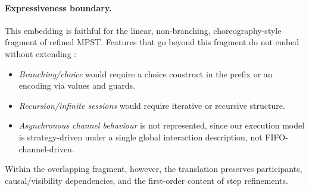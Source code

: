 \paragraph{Expressiveness boundary.}
This embedding is faithful for the linear, non-branching, choreography-style
fragment of refined MPST. Features that go beyond this fragment do not embed
without extending \KFOL{}:
\begin{itemize}[nosep]
  \item \emph{Branching/choice} would require a choice construct in the prefix
        or an encoding via values and guards.
  \item \emph{Recursion/infinite sessions} would require iterative or recursive
        structure.
  \item \emph{Asynchronous channel behaviour} is not represented, since our
        execution model is strategy-driven under a single global interaction
        description, not FIFO-channel-driven.
\end{itemize}
Within the overlapping fragment, however, the translation preserves
participants, causal/visibility dependencies, and the first-order content of
step refinements.
